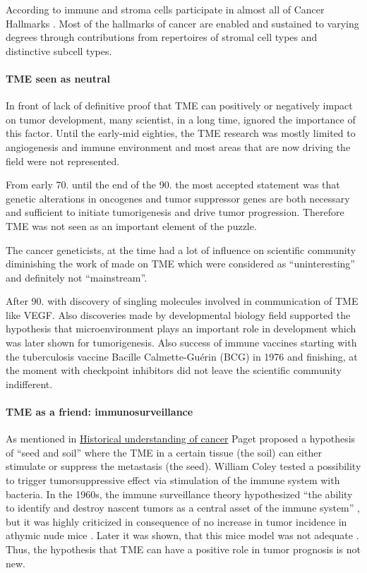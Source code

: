 \documentclass[12pt,]{book}
\let\oldparagraph\paragraph
\renewcommand{\paragraph}[1]{\oldparagraph{#1}\mbox{}}
\theoremstyle{definition}
\theoremstyle{definition}
\theoremstyle{definition}
\theoremstyle{remark}
\begin{document}
According to \citep{Hanahan2012} immune and stroma cells participate in
almost all of Cancer Hallmarks \citep{Hanahan2000, Hanahan2012}. Most of
the hallmarks of cancer are enabled and sustained to varying degrees
through contributions from repertoires of stromal cell types and
distinctive subcell types.

\hypertarget{tme-seen-as-neutral}{%
\paragraph{TME seen as neutral}\label{tme-seen-as-neutral}}

In front of lack of definitive proof that TME can positively or
negatively impact on tumor development, many scientist, in a long time,
ignored the importance of this factor. Until the early-mid eighties, the
TME research was mostly limited to angiogenesis and immune environment
and most areas that are now driving the field were not represented.

From early 70. until the end of the 90. the most accepted statement was
that genetic alterations in oncogenes and tumor suppressor genes are
both necessary and sufficient to initiate tumorigenesis and drive tumor
progression. Therefore TME was not seen as an important element of the
puzzle.

The cancer geneticists, at the time had a lot of influence on scientific
community diminishing the work of made on TME which were considered as
``uninteresting'' and definitely not ``mainstream''.

After 90. with discovery of singling molecules involved in communication
of TME like VEGF. Also discoveries made by developmental biology field
supported the hypothesis that microenvironment plays an important role
in development which was later shown for tumorigenesis. Also success of
immune vaccines starting with the tuberculosis vaccine Bacille
Calmette-Guérin (BCG) in 1976 and finishing, at the moment with
checkpoint inhibitors did not leave the scientific community
indifferent.

\hypertarget{tme-as-a-friend-immunosurveillance}{%
\paragraph{TME as a friend:
immunosurveillance}\label{tme-as-a-friend-immunosurveillance}}

As mentioned in \protect\hyperlink{hist}{Historical understanding of
cancer} Paget proposed a hypothesis of ``seed and soil'' where the TME
in a certain tissue (the soil) can either stimulate or suppress the
metastasis (the seed). William Coley tested a possibility to trigger
tumorsuppressive effect via stimulation of the immune system with
bacteria. In the 1960s, the immune surveillance theory hypothesized
``the ability to identify and destroy nascent tumors as a central asset
of the immune system'' \citep{Sebeok1976, Burnet1970}, but it was highly
criticized in consequence of no increase in tumor incidence in athymic
nude mice \citep{Stutman1974, Rygaard1976}. Later it was shown, that
this mice model was not adequate \citep{Cavallo2011} . Thus, the
hypothesis that TME can have a positive role in tumor prognosis is not
new.
\end{document}
